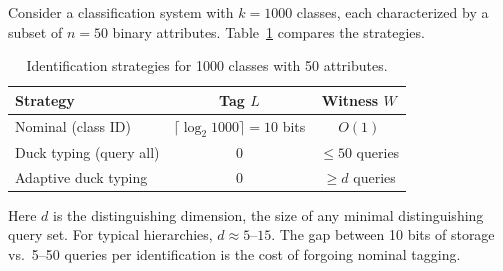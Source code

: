 Consider a classification system with $k = 1000$ classes, each characterized by a subset of $n = 50$ binary attributes. Table~\ref{tab:strategies} compares the strategies.

\begin{table}[t]
\centering
\caption{Identification strategies for 1000 classes with 50 attributes.}
\label{tab:strategies}
\begin{tabular}{lcc}
\toprule
\textbf{Strategy} & \textbf{Tag $L$} & \textbf{Witness $W$} \\
\midrule
Nominal (class ID) & $\lceil \log_2 1000 \rceil = 10$ bits & $O(1)$ \\
Duck typing (query all) & $0$ & $\leq 50$ queries \\
Adaptive duck typing & $0$ & $\geq d$ queries \\
\bottomrule
\end{tabular}
\end{table}

Here $d$ is the distinguishing dimension, the size of any minimal distinguishing query set. For typical hierarchies, $d \approx 5$--$15$. The gap between 10 bits of storage vs.\ 5--50 queries per identification is the cost of forgoing nominal tagging.
